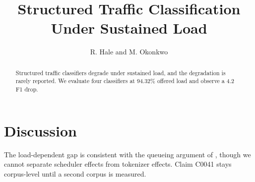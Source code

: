 \documentclass[11pt]{article}
\title{Structured Traffic Classification Under Sustained Load}
\author{R. Hale and M. Okonkwo}
\begin{document}
\maketitle

\begin{abstract}
Structured traffic classifiers degrade under sustained load, and the degradation is
rarely reported. We evaluate four classifiers at 94.32\% offered load and observe a
4.2 F1 drop.
\end{abstract}





\section{Discussion}
\label{sec:discussion}

The load-dependent gap is consistent with the queueing argument of \citet{hart2018},
though we cannot separate scheduler effects from tokenizer effects. Claim C0041 stays
corpus-level until a second corpus is measured.



\end{document}
